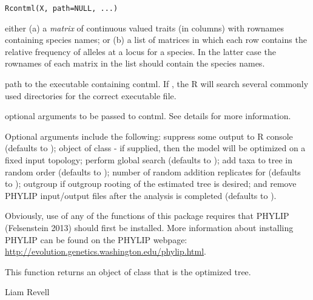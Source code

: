 \documentclass[a4paper]{book}
\begin{document}
%
\begin{Usage}
\begin{verbatim}
Rcontml(X, path=NULL, ...)
\end{verbatim}
\end{Usage}
%
\begin{Arguments}
\begin{ldescription}
\item[\code{X}] either (a) a \emph{matrix} of continuous valued traits (in columns) with rownames containing species names; or (b) a list of matrices in which each row contains the relative frequency of alleles at a locus for a species. In the latter case the rownames of each matrix in the list should contain the species names.
\item[\code{path}] path to the executable containing contml. If , the R will search several commonly used directories for the correct executable file.
\item[\code{...}] optional arguments to be passed to contml. See details for more information.
\end{ldescription}
\end{Arguments}
%
\begin{Details}\relax
Optional arguments include the following:  suppress some output to R console (defaults to );  object of class  - if supplied, then the model will be optimized on a fixed input topology;  perform global search (defaults to );  add taxa to tree in random order (defaults to );  number of random addition replicates for  (defaults to );  outgroup if outgroup rooting of the estimated tree is desired; and  remove PHYLIP input/output files after the analysis is completed (defaults to ).

Obviously, use of any of the functions of this package requires that PHYLIP (Felsenstein 2013) should first be installed. More information about installing PHYLIP can be found on the PHYLIP webpage: \url{http://evolution.genetics.washington.edu/phylip.html}.
\end{Details}
%
\begin{Value}
This function returns an object of class  that is the optimized tree.
\end{Value}
%
\begin{Author}\relax
Liam Revell 
\end{Author}
\end{document}
